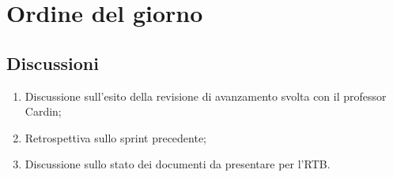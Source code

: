 \section{Ordine del giorno} \label{sec:agenda}
\subsection{Discussioni} \label{subsec:discussione}
\begin{enumerate}
    \item Discussione sull'esito della revisione di avanzamento svolta con il professor Cardin;
    \item Retrospettiva sullo sprint precedente;
    \item Discussione sullo stato dei documenti da presentare per l’RTB.

    
\end{enumerate}

